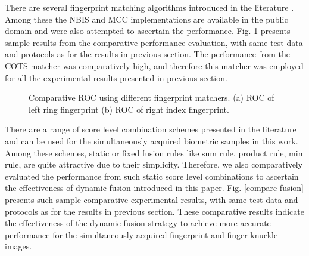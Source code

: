 There are several fingerprint matching algorithms introduced in the literature \cite{maltoni2009handbook}. Among these the NBIS and MCC implementations are available in the public domain and were also attempted to ascertain the performance. Fig. \ref{compare-fingerprint} presents sample results from the comparative performance evaluation, with same test data and protocols as for the results in previous section. The performance from the COTS matcher was comparatively high, and therefore this matcher was employed for all the experimental results presented in previous section. 
\begin{figure}[ht]
    \centering
    \caption{Comparative ROC using different fingerprint matchers. (a) ROC of left ring fingerprint (b) ROC of right index fingerprint.}
    \label{compare-fingerprint}
\end{figure}

There are a range of score level combination schemes presented in the literature and can be used for the simultaneously acquired biometric samples in this work. Among these schemes, static or fixed fusion rules like sum rule, product rule, min rule, are quite attractive due to their simplicity. Therefore, we also comparatively evaluated the performance from such static score level combinations to ascertain the effectiveness of dynamic fusion introduced in this paper. Fig. \ref{compare-fusion} presents such sample comparative experimental results, with same test data and  protocols as for the results in previous section. These comparative results indicate the effectiveness of the dynamic fusion strategy to achieve more accurate performance for the simultaneously acquired fingerprint and finger knuckle images.

